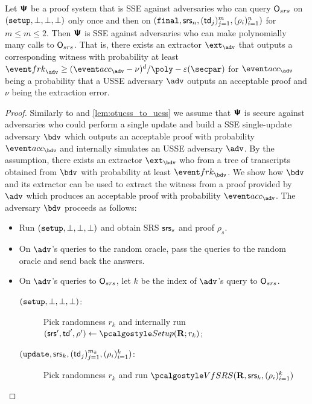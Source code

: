 \documentclass[runningheads,11pt]{llncs}
\begin{document}
\begin{lemma}
  Let $\bm{\mathsf{\Psi}}$ be a proof system that is SSE against adversaries who can query
  $\mathsf{O}_{srs}$ on $(\mathtt{setup}, \bot, \bot, \bot)$ only once and then on
  $(\mathtt{final}, \mathsf{srs}_n, (\mathsf{td}_j)_{j = 1}^m, (\rho_i)_{i = 1}^n)$ for
  $m \leq m \leq 2$. Then $\bm{\mathsf{\Psi}}$ is SSE against adversaries who can make
  polynomially many calls to $\mathsf{O}_{srs}$. That is, there exists an extractor
  $\ext_\adv$ that outputs a corresponding witness with probability at least
  $\frkProb_\adv \geq \infrac{(\accProb_\adv - \nu)^d}{\poly} - \eps(\secpar)$
  for $\accProb_\adv$ being a probability that a USSE adversary $\adv$ outputs
  an acceptable proof and $\nu$ being the extraction error.
\end{lemma}
\begin{proof}
  Similarly to \cite{C:GKMMM18} and \cref{lem:otucss_to_ucss} we assume that
  $\bm{\mathsf{\Psi}}$ is secure against adversaries who could perform a single update and
  build a SSE single-update adversary $\bdv$ which outputs an acceptable proof
  with probability $\accProb_\bdv$ and internally simulates an USSE adversary
  $\adv$. By the assumption, there exists an extractor $\ext_\bdv$ who from a
  tree of transcripts obtained from $\bdv$ with probability at least
  $\frkProb_\bdv$. We show how $\bdv$ and its extractor can be used to extract
  the witness from a proof provided by $\adv$ which produces an acceptable proof
  with probability $\accProb_\adv$.  The adversary $\bdv$ proceeds as follows:
  \begin{itemize}
  \item Run $(\mathtt{setup}, \bot, \bot, \bot)$ and obtain SRS $\mathsf{srs}_s$ and proof
    $\rho_s$.
  \item On $\adv$'s queries to the random oracle, pass the queries to the
    random oracle and send back the answers.
  \item On $\adv$'s queries to $\mathsf{O}_{srs}$, let $k$ be the index of $\adv$'s
    query to $\mathsf{O}_{srs}$.
    \begin{description}
    \item [$(\mathtt{setup}, \bot, \bot, \bot)$:] Pick randomness $r_k$ and internally
      run $(\srs', \td', \rho') \gets \algsetup(\REL; r_k)$;
    \item [$(\mathtt{update}, \mathsf{srs}_{k}, (\mathsf{td}_j)_{j = 1}^{m_k}, (\rho_i)_{i = 1}^{k})$:] Pick
      randomness $r_k$ and run $\algverifysrs(\REL, \srs_{k}, (\rho_i)_{i = 1}^{k})$

\end{description}
\end{itemize}
\end{proof}
\end{document}
